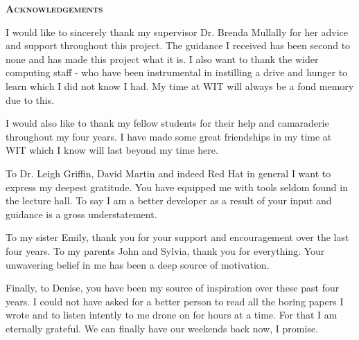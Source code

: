 \begin{center}
{\scshape\LARGE \textbf{Acknowledgements}\par}
\end{center}
\thispagestyle{empty}
\vspace{1cm}
I would like to sincerely thank my supervisor Dr. Brenda Mullally for her advice and support throughout this project. The guidance I received has been second to none and has made this project what it is. I also want to thank the wider computing staff - who have been instrumental in instilling a drive and hunger to learn which I did not know I had. My time at WIT will always be a fond memory due to this. 

I would also like to thank my fellow students for their help and camaraderie throughout my four years. I have made some great friendships in my time at WIT which I know will last beyond my time here.

To Dr. Leigh Griffin, David Martin and indeed Red Hat in general I want to express my deepest gratitude. You have equipped me with tools seldom found in the lecture hall. To say I am a better developer as a result of your input and guidance is a gross understatement.

To my sister Emily, thank you for your support and encouragement over the last four years. To my parents John and Sylvia, thank you for everything. Your unwavering belief in me has been a deep source of motivation.

Finally, to Denise, you have been my source of inspiration over these past four years. I could not have asked for a better person to read all the boring papers I wrote and to listen intently to me drone on for hours at a time. For that I am eternally grateful. We can finally have our weekends back now, I promise.

\clearpage
